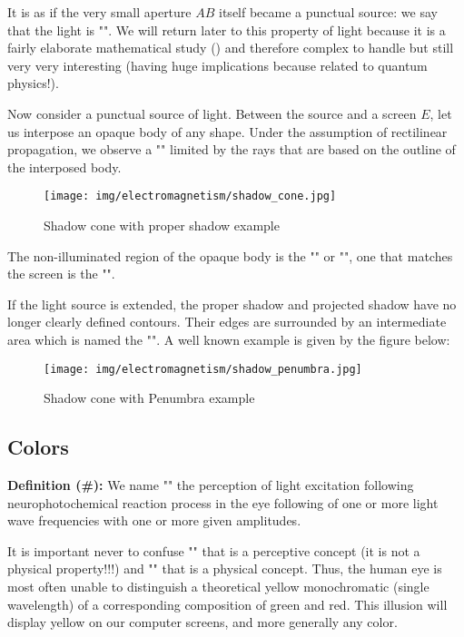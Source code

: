 	It is as if the very small aperture $AB$ itself became a punctual source: we say that the light is "". We will return later to this property of light because it is a fairly elaborate mathematical study () and therefore complex to handle but still very very interesting (having huge implications because related to quantum physics!).
	
	Now consider a punctual source of light. Between the source and a screen $E$, let us interpose an opaque body of any shape. Under the assumption of rectilinear propagation, we observe a "" limited by the rays that are based on the outline of the interposed body.
	\begin{figure}[H]
		\centering
		\texttt{[image: img/electromagnetism/shadow\_cone.jpg]}
		\caption{Shadow cone with proper shadow example}
	\end{figure}
	The non-illuminated region of the opaque body is the "" or "", one that matches the screen is the "".
	
	If the light source is extended, the proper shadow and projected shadow have no longer clearly defined contours. Their edges are surrounded by an intermediate area which is named the "". A well known example is given by the figure below:
	\begin{figure}[H]
		\centering
		\texttt{[image: img/electromagnetism/shadow\_penumbra.jpg]}
		\caption{Shadow cone with Penumbra example}
	\end{figure}
	
	\subsection{Colors}
	\textbf{Definition (\#\mydef):} We name "" the perception of light excitation following neurophotochemical reaction process in the eye following of one or more light wave frequencies with one or more given amplitudes.
	
	It is important never to confuse "" that is a perceptive concept  (it is not a physical property!!!) and "" that is a physical concept. Thus, the human eye is most often unable to distinguish a theoretical yellow monochromatic (single wavelength) of a corresponding composition of green and red. This illusion will display yellow on our computer screens, and more generally any color.
	
